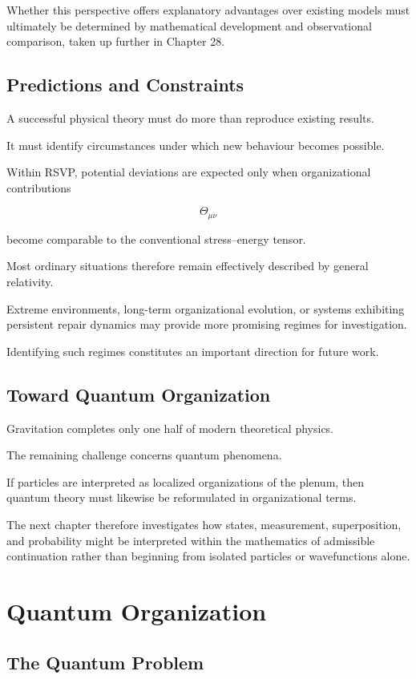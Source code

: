 \documentclass[11pt,oneside]{book}
\numberwithin{equation}{chapter}
\theoremstyle{definition}
\theoremstyle{plain}
\begin{document}
Whether this perspective offers explanatory advantages over existing models
must ultimately be determined by mathematical development and observational
comparison, taken up further in Chapter 28.

\section{Predictions and Constraints}

A successful physical theory must do more than reproduce existing results.

It must identify circumstances under which new behaviour becomes possible.

Within RSVP, potential deviations are expected only when organizational
contributions

\[
\Theta_{\mu\nu}
\]

become comparable to the conventional stress--energy tensor.

Most ordinary situations therefore remain effectively described by general
relativity.

Extreme environments, long-term organizational evolution, or systems
exhibiting persistent repair dynamics may provide more promising regimes for
investigation.

Identifying such regimes constitutes an important direction for future work.

\section{Toward Quantum Organization}

Gravitation completes only one half of modern theoretical physics.

The remaining challenge concerns quantum phenomena.

If particles are interpreted as localized organizations of the plenum, then
quantum theory must likewise be reformulated in organizational terms.

The next chapter therefore investigates how states, measurement,
superposition, and probability might be interpreted within the mathematics
of admissible continuation rather than beginning from isolated particles or
wavefunctions alone.

\chapter{Quantum Organization}

\section{The Quantum Problem}
\end{document}
